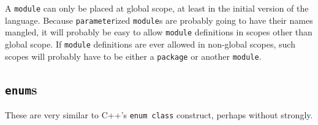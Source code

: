 \documentclass{article}
\begin{document}
	A \texttt{module} can only be placed at global scope, at least in the
	initial version of the language.  Because \texttt{parameter}ized
	\texttt{module}s are probably going to have their names mangled, it
	will probably be easy to allow \texttt{module} definitions in scopes
	other than global scope.  If \texttt{module} definitions are ever
	allowed in non-global scopes, such scopes will probably have to be
	either a \texttt{package} or another \texttt{module}.

	\subsection{\texttt{enum}s}

	These are very similar to C++'s \texttt{enum class} construct, perhaps
	without strongly.


\end{document}
